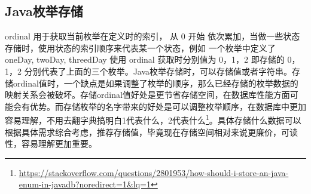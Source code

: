 \documentclass[../../../interview-questions.tex]{subfiles}
\begin{document}
\subsection{Java枚举存储}

ordinal 用于获取当前枚举在定义时的索引， 从 0 开始 依次累加，当做一些状态存储时，使用状态的索引顺序来代表某一个状态，例如 一个枚举中定义了 oneDay, twoDay, threedDay 使用 ordinal 获取时分别值为 0，1，2 即存储的 0，1，2 分别代表了上面的三个枚举。Java枚举存储时，可以存储值或者字符串。存储ordinal值时，一个缺点是如果调整了枚举的顺序，那么已经存储的枚举数据的映射关系会被破坏。存储ordinal值好处是更节省存储空间，在数据库性能方面可能会有优势。而存储枚举的名字带来的好处是可以调整枚举顺序，在数据库中更加容易理解，不用去翻字典搞明白1代表什么，2代表什么\footnote{\url{https://stackoverflow.com/questions/2801953/how-should-i-store-an-java-enum-in-javadb?noredirect=1&lq=1}}。具体存储什么数据可以根据具体需求综合考虑，推荐存储值，毕竟现在存储空间相对来说更廉价，可读性，容易理解更加重要。
\end{document}
